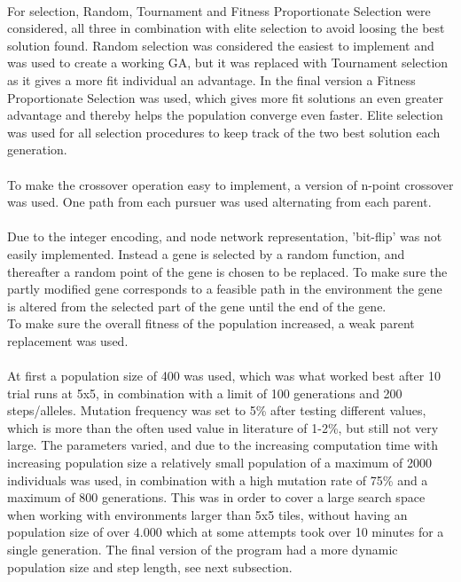 \\For selection, Random, Tournament  and Fitness Proportionate Selection were considered, all three in combination with elite selection to avoid loosing the best solution found. Random selection was considered the easiest to implement and was used to create a working GA, but it was replaced with Tournament selection as it gives a more fit individual an advantage. In the final version a Fitness Proportionate Selection was used, which gives more fit solutions an even greater advantage and thereby helps the population converge even faster. Elite selection was used for all selection procedures to keep track of the two best solution each generation.\\
\\To make the crossover operation easy to implement, a version of n-point crossover was used. One path from each pursuer was used alternating from each parent.\\
\\Due to the integer encoding, and node network representation, 'bit-flip' was not easily implemented. Instead a gene is selected by a random function, and thereafter a random point of the gene is chosen to be replaced. To make sure the partly modified gene corresponds to a feasible path in the environment the gene is altered from the selected part of the gene until the end of the gene.
\\To make sure the overall fitness of the population increased, a weak parent replacement was used.\\
\\At first a population size of 400 was used, which was what worked best after 10 trial runs at 5x5, in combination with a limit of 100 generations and 200 steps/alleles. Mutation frequency was set to 5\% after testing different values, which is more than the often used value in literature \cite{GAHandbook2} of 1-2\%, but still not very large. The parameters varied, and due to the increasing computation time with increasing population size a relatively small population of a maximum of 2000 individuals was used, in combination with a high mutation rate of 75\% and a maximum of 800 generations. This was in order to cover a large search space when working with environments larger than 5x5 tiles, without having an population size of over 4.000 which at some attempts took over 10 minutes for a single generation. The final version of the program had a more dynamic population size and step length, see next subsection.

